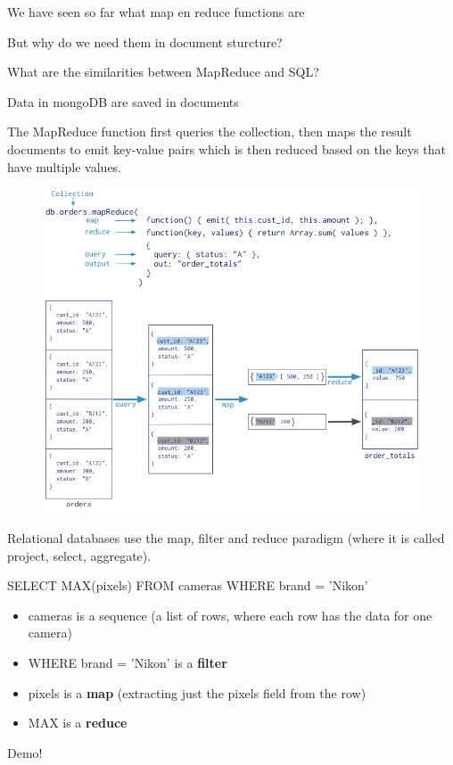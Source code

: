 \documentclass{beamer}
\begin{document}
\begin{slide}{
\item We have seen so far what map en reduce functions are
\item But why do we need them in document sturcture?
\item What are the similarities between MapReduce and SQL?
}\end{slide}

\begin{slide}{
\item Data in mongoDB are saved in documents
\item The MapReduce function first queries the collection, then maps the result documents to emit key-value pairs which is then reduced based on the keys that have multiple values.
\begin{figure}
		\includegraphics[scale=0.26]{img/map-reduce}
\end{figure}
}\end{slide}

\begin{slide}{
\item Relational databases use the map, filter and reduce paradigm (where it is called project, select, aggregate).
\item SELECT MAX(pixels) FROM  cameras WHERE brand = 'Nikon' 
\begin{itemize}
\item cameras is a sequence (a list of rows, where each row has the data for one camera)
\item WHERE brand = 'Nikon'  is a \textbf{filter}
\item pixels is a \textbf{map} (extracting just the pixels field from the row)
\item MAX is a \textbf{reduce}
\end{itemize}
\item Demo!
}\end{slide}
\end{document}
